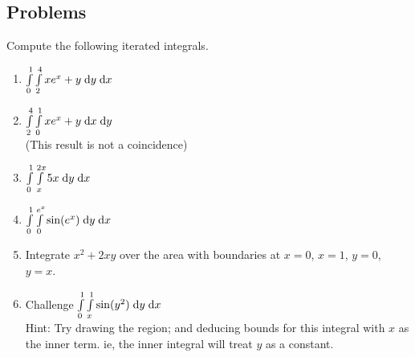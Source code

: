 \documentclass[letterpaper,11pt]{article}
\begin{document}
  \subsection*{Problems}
  Compute the following iterated integrals.

  \begin{enumerate}
    \item $\int \limits_{0}^{1} \int \limits_{2}^{4} x e^{x} + y \;\mathrm{d}y \;\mathrm{d}x$\\
      \newline
      \newline
    \item $\int \limits_{2}^{4} \int \limits_{0}^{1} x e^{x} + y \;\mathrm{d}x \;\mathrm{d}y$\\
      (This result is not a coincidence)\\
      \newline
      \newline
    \item $\int \limits_{0}^{1} \int \limits_{x}^{2 x} 5 x \;\mathrm{d}y \;\mathrm{d}x$\\
      \newline
      \newline
    \item $\int \limits_{0}^{1} \int \limits_{0}^{e^{x}} \sin(e^x) \;\mathrm{d}y \;\mathrm{d}x$\\
      \newline
      \newline
    \item Integrate $x^2 + 2 x y$ over the area with boundaries at $x = 0$, $x = 1$, $y = 0$, $y = x$.\\
      \newline
      \newline
    \item Challenge $\int \limits_{0}^{1} \int \limits_{x}^{1} \sin(y^2) \;\mathrm{d}y \;\mathrm{d}x$\\
      Hint: Try drawing the region; and deducing bounds for this integral with $x$ as the inner term.
      ie, the inner integral will treat $y$ as a constant.\\
      \newline
      \newline
  \end{enumerate}
\end{document}
